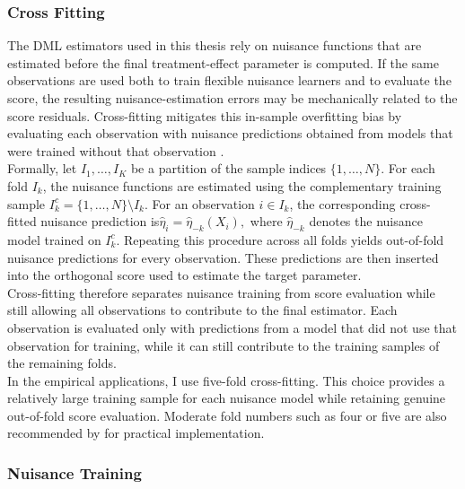 \documentclass[12pt, a4paper, oneside]{article}
\theoremstyle{plain}
\theoremstyle{definition}
\begin{document}
\subsubsection{Cross Fitting}
\label{cross fitting}
The DML estimators used in this thesis rely on nuisance functions that are estimated before the final treatment-effect parameter is computed. 
 If the same observations are
used both to train flexible nuisance learners and to evaluate the score, the
resulting nuisance-estimation errors may be mechanically related to the score
residuals. Cross-fitting mitigates this in-sample overfitting bias by
evaluating each observation with nuisance predictions obtained from models that
were trained without that observation
\citep{chernozhukov2018double}.\\
Formally, let \(I_1,\ldots,I_K\) be a partition of the sample indices
\(\{1,\ldots,N\}\). For each fold \(I_k\), the nuisance functions are estimated
using the complementary training sample
$
    I_k^c=\{1,\ldots,N\}\setminus I_k.
$
For an observation \(i\in I_k\), the corresponding cross-fitted nuisance
prediction is$
    \widehat{\eta}_i
    =
    \widehat{\eta}_{-k}(X_i),
$
where \(\widehat{\eta}_{-k}\) denotes the nuisance model trained on \(I_k^c\).
Repeating this procedure across all folds yields out-of-fold nuisance
predictions for every observation. These predictions are then inserted into
the orthogonal score used to estimate the target parameter.\\
Cross-fitting therefore separates nuisance training from score evaluation
while still allowing all observations to contribute to the final estimator.
Each observation is evaluated only with predictions from a model that did not
use that observation for training, while it can still contribute to the
training samples of the remaining folds.\\
In the empirical applications, I use five-fold cross-fitting. This choice
provides a relatively large training sample for each nuisance model while
retaining genuine out-of-fold score evaluation. Moderate fold numbers such as
four or five are also recommended by
\citet{chernozhukov2018double} for practical implementation.

\subsubsection{Nuisance Training}
\end{document}
